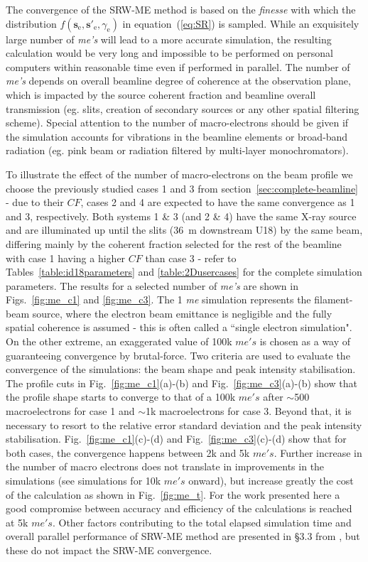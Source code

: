 \documentclass{iucr}              %
\begin{document}
The convergence of the SRW-ME method is based on the \textit{finesse} with which the distribution $f(\textbf{s}_\text{e}, \textbf{s}'_\text{e}, \gamma_\text{e})$  in equation~(\ref{eq:SR}) is sampled. While an exquisitely large number of \textit{me's} will lead to a more accurate simulation, the resulting calculation would be very long and impossible to be performed on personal computers within reasonable time even if performed in parallel. The number of \textit{me's} depends on overall beamline degree of coherence at the observation plane, which is impacted by the source coherent fraction and beamline overall transmission (eg. slits, creation of secondary sources or any other spatial filtering scheme). Special attention to the number of macro-electrons should be given if the simulation accounts for vibrations in the beamline elements or broad-band radiation (eg. pink beam or radiation filtered by multi-layer monochromators).

To illustrate the effect of the number of macro-electrons on the beam profile we choose the previously studied cases 1 and 3 from section~\ref{sec:complete-beamline} - due to their $CF$, cases 2 and 4 are expected to have the same convergence as 1 and 3, respectively. Both systems 1 \& 3 (and 2 \& 4) have the same X-ray source and are illuminated up until the slits (36~m downstream U18) by the same beam, differing mainly by the coherent fraction selected for the rest of the beamline with case 1 having a higher $CF$ than case 3 - refer to Tables~\ref{table:id18parameters} and \ref{table:2Dusercases} for the complete simulation parameters. The results for a selected number of \textit{me's} are shown in Figs.~\ref{fig:me_c1} and \ref{fig:me_c3}. The 1 \textit{me} simulation represents the filament-beam source, where the electron beam emittance is negligible and the fully spatial coherence is assumed - this is often called a ``single electron simulation". On the other extreme, an exaggerated value of 100k $me's$ is chosen as a way of guaranteeing convergence by brutal-force. Two criteria are used to evaluate the convergence of the simulations: the beam shape and peak intensity stabilisation. The profile cuts in  Fig.~\ref{fig:me_c1}(a)-(b) and Fig.~\ref{fig:me_c3}(a)-(b) show that the profile shape starts to converge to that of a 100k $me's$ after $\sim$500 macroelectrons for case 1 and $\sim$1k macroelectrons for case 3. Beyond that, it is necessary to resort to the relative error standard deviation and the peak intensity stabilisation. Fig.~\ref{fig:me_c1}(c)-(d) and Fig.~\ref{fig:me_c3}(c)-(d) show that for both cases, the convergence happens between 2k and 5k $me's$. Further increase in the number of macro electrons does not translate in improvements in the simulations (see simulations for 10k $me's$ onward), but increase greatly the cost of the calculation as shown in Fig.~\ref{fig:me_t}. For the work presented here a good compromise between accuracy and efficiency of the calculations is reached at 5k $me's$. Other factors contributing to the total elapsed simulation time and overall parallel performance of SRW-ME method are presented in \S3.3 from \cite{codeSRW_MEscan}, but these do not impact the SRW-ME convergence.
\end{document}
